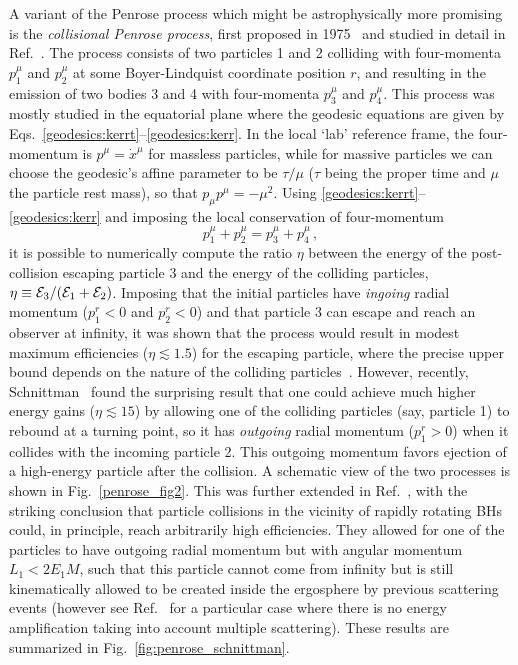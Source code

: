 \documentclass[11pt]{article}
\newcommand{\be}{\begin{equation}}
\newcommand{\ee}{\end{equation}}
\numberwithin{equation}{section} %
\begin{document}
A variant of the Penrose process which might be astrophysically more promising is the {\em collisional Penrose process}, first proposed in 1975~\cite{1975ApJ...196L.107P} and studied in detail in Ref.~\cite{Piran:1977dm}. The process consists of two particles 1 and 2 colliding with four-momenta $p^{\mu}_1$ and $p^{\mu}_2$ at some Boyer-Lindquist coordinate position $r$, and resulting in the emission of two bodies 3 and 4 with four-momenta $p^{\mu}_3$ and $p^{\mu}_4$. This process was mostly studied in the equatorial plane where the geodesic equations are given by Eqs.~\eqref{geodesics:kerrt}--\eqref{geodesics:kerr}. In the local `lab' reference frame, the four-momentum is $p^{\mu}=\dot{x}^{\mu}$ for massless particles, while for massive particles we can choose the geodesic's affine parameter to be $\tau/\mu$ ($\tau$ being the proper time and $\mu$ the particle rest mass), so that $p_{\mu}p^{\mu}=-\mu^2$. Using \eqref{geodesics:kerrt}--\eqref{geodesics:kerr} and imposing the local conservation of four-momentum
%
\be
p^{\mu}_1+p^{\mu}_2=p^{\mu}_3+p^{\mu}_4\,,
\ee
%
it is possible to numerically compute the ratio $\eta$ 
between the energy of the post-collision escaping particle 3 and the energy of the colliding particles, $\eta\equiv {\cal E}_3/({\cal E}_1+{\cal E}_2)$. Imposing that the initial particles have {\it ingoing} radial momentum ($p_1^r<0$ and $p_2^r<0$) and that particle 3 can escape and reach an observer at infinity, it was shown that the process would result in modest maximum efficiencies ($\eta\lesssim 1.5$) for the escaping particle, where the precise upper bound depends on the nature of the colliding particles~\cite{Piran:1977dm,Harada:2012ap,Bejger:2012yb,Zaslavskii:2012yp}. However, recently, Schnittman~\cite{Schnittman:2014zsa} found the surprising result that one could achieve much higher energy gains ($\eta \lesssim 15$) by allowing one of the colliding particles (say, particle 1) to rebound at a turning point, so it has {\it outgoing} radial momentum ($p_1^r>0$) when it collides with the incoming particle 2. This outgoing momentum favors ejection of a high-energy particle after the collision. A schematic view of the two processes is shown in Fig.~\ref{penrose_fig2}. This was further extended in Ref.~\cite{Berti:2014lva}, with the striking conclusion that particle collisions in the vicinity of rapidly rotating BHs could, in principle, reach arbitrarily high efficiencies. They allowed for one of the particles to have outgoing radial momentum but with angular momentum $L_1<2E_1 M$, such that this particle cannot come from infinity but is still kinematically allowed to be created inside the ergosphere by previous scattering events (however see Ref.~\cite{Leiderschneider:2015ika} for a particular case where there is no energy amplification taking into account multiple scattering). These results are summarized in Fig.~\ref{fig:penrose_schnittman}.
\end{document}
